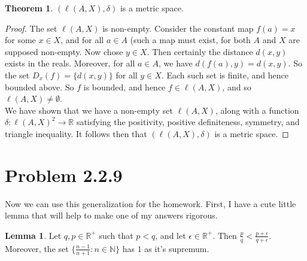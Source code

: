 \documentclass[11pt]{article}
\newcommand{\R}{\mathbb{R}}
\newcommand{\N}{\mathbb{N}}
\theoremstyle{definition}
\newtheorem{theorem}{Theorem}
\newtheorem{lemma}{Lemma}
\begin{document}
\begin{theorem}
$(\ell(A,X), \delta)$ is a metric space.
\end{theorem}

\begin{proof}
The set $\ell(A,X)$ is non-empty. Consider the constant map $f(a) = x$ for some $x\in X$, and for all $a\in A$ (such a map must exist, for both $A$ and $X$ are supposed non-empty. Now chose $y\in X$. Then certainly the distance $d(x,y)$ exists in the reals. Moreover, for all $a\in A$, we have $d(f(a), y) = d(x,y)$. So the set $D_x(f) = \{d(x,y)\}$ for all $y\in X$. Each such set is finite, and hence bounded above. So $f$ is bounded, and hence $f\in \ell(A,X)$, and so $\ell(A,X)\ne \emptyset$. \\

We have shown that we have a non-empty set $\ell(A,X)$, along with a function $\delta:\ell(A,X)^2 \to \R$ satisfying the positivity, positive definiteness, symmetry, and triangle inequality. It follows then that $(\ell(A,X), \delta)$ is a metric space.
\end{proof}

\section{Problem 2.2.9}
Now we can use this generalization for the homework. First, I have a cute little lemma that will help to make one of my answers rigorous.\\

\begin{lemma}
Let $q,p\in \R^+$ such that $p< q$, and let $\epsilon\in \R^+$. Then $\frac{p}{q} < \frac{p+ \epsilon}{q+ \epsilon}$. Moreover, the set $\{\frac{n-1}{n+1}: n\in \N\}$ has $1$ as it's supremum. 
\end{lemma}
\end{document}
